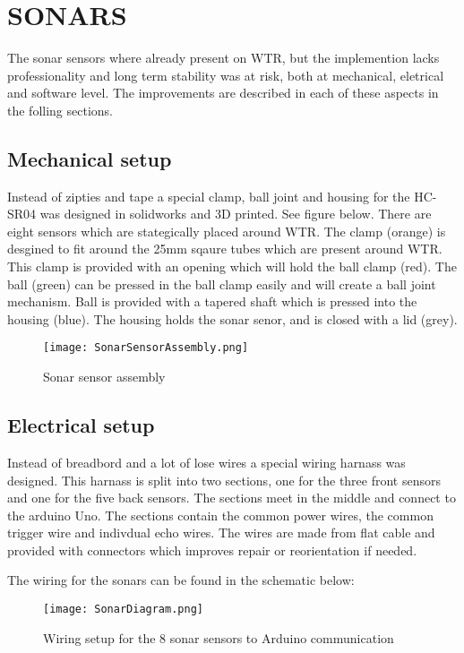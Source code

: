\section{SONARS}
The sonar sensors where already present on WTR, but the implemention lacks professionality and long term stability was at risk, both at mechanical, eletrical and software level.
The improvements are described in each of these aspects in the folling sections.

\subsection{Mechanical setup}
Instead of zipties and tape a special clamp, ball joint and housing for the HC-SR04 was designed in solidworks and 3D printed. See figure below.
There are eight sensors which are stategically placed around WTR.
The clamp (orange) is desgined to fit around the 25mm sqaure tubes which are present around WTR. 
This clamp is provided with an opening which will hold the ball clamp (red).
The ball (green) can be pressed in the ball clamp easily and will create a ball joint mechanism.
Ball is provided with a tapered shaft which is pressed into the housing (blue).
The housing holds the sonar senor, and is closed with a lid (grey).

\begin{figure}[H]
\centering
\texttt{[image: SonarSensorAssembly.png]}
\caption{Sonar sensor assembly}
\label{fig::sonarassembly}
\end{figure}


\subsection{Electrical setup}
Instead of breadbord and a lot of lose wires a special wiring harnass was designed. 
This harnass is split into two sections, one for the three front sensors and one for the five back sensors.
The sections meet in the middle and connect to the arduino Uno.
The sections contain the common power wires, the common trigger wire and indivdual echo wires.
The wires are made from flat cable and provided with connectors which improves repair or reorientation if needed.

The wiring for the sonars can be found in the schematic below:

\begin{figure}[H]
\centering
\texttt{[image: SonarDiagram.png]}
\caption{Wiring setup for the 8 sonar sensors to Arduino communication}
\label{fig::wiringsonar}
\end{figure}

 
    